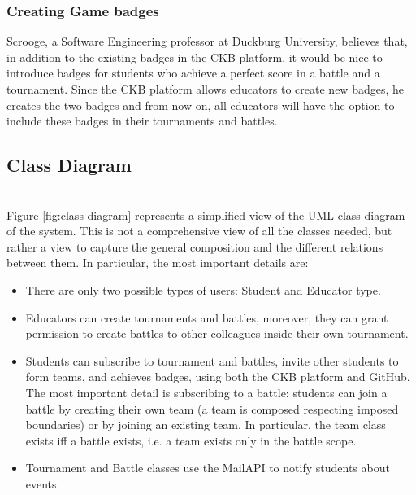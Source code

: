 \subsubsection{Creating Game badges}
Scrooge, a Software Engineering professor at Duckburg University, believes that, in addition to the existing badges in the CKB platform, it would be nice to introduce badges for students who achieve a perfect score in a battle and a tournament.
Since the CKB platform allows educators to create new badges, he creates the two badges and from now on, all educators will have the option to include these badges in their tournaments and battles.

\subsection{Class Diagram}
{\color{red}{AGGIUNGERE classe testcase. TOGLIERE TeamScore, è uguale a ranking in battle. Togliere creates battle da educator, ridondante}} \\
Figure \ref{fig:class-diagram} represents a simplified view of the UML class diagram of the system. 
This is not a comprehensive view of all the classes needed, but rather a view to capture the general composition and the different relations between them.
In particular, the most important details are:
\begin{itemize}
    \item There are only two possible types of users: Student and Educator type.
    \item Educators can create tournaments and battles, moreover, they can grant permission to create battles to other colleagues inside their own tournament.
    \item Students can subscribe to tournament and battles, invite other students to form teams, and achieves badges, using both the CKB platform and GitHub. 
          The most important detail is subscribing to a battle: students can join a battle by creating their own team (a team is composed respecting imposed boundaries) or by joining an existing team. 
          In particular, the team class exists iff a battle exists, i.e. a team exists only in the battle scope.
    \item Tournament and Battle classes use the MailAPI to notify students about events.
\end{itemize}

